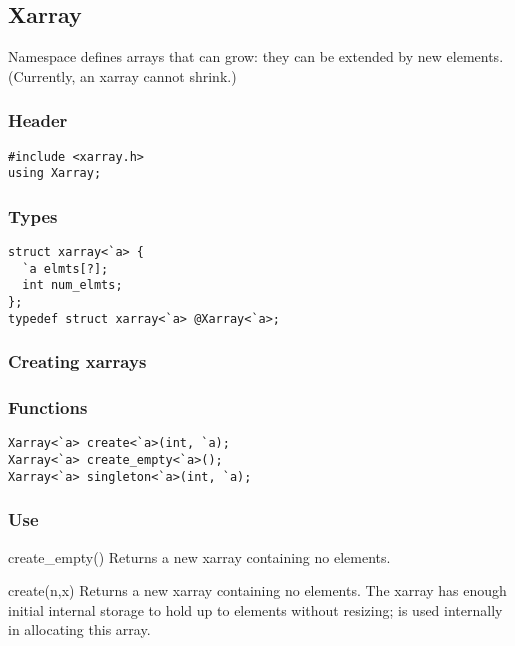 \subsection{Xarray}

Namespace  defines arrays that can grow: they can be
extended by new elements.  (Currently, an xarray cannot shrink.)

\subsubsection*{Header}
\begin{verbatim}
#include <xarray.h>
using Xarray;
\end{verbatim}

\subsubsection*{Types}
\begin{verbatim}
struct xarray<`a> {
  `a elmts[?];
  int num_elmts;
};
typedef struct xarray<`a> @Xarray<`a>;
\end{verbatim}

\subsubsection*{Creating xarrays}
\subsubsection*{Functions}
\begin{verbatim}
Xarray<`a> create<`a>(int, `a);
Xarray<`a> create_empty<`a>();
Xarray<`a> singleton<`a>(int, `a);
\end{verbatim}

\subsubsection*{Use}

\begin{defun}{create_empty}{()}
Returns a new xarray containing no elements.
\end{defun}

\begin{defun}{create}{(n,x)}
Returns a new xarray containing no elements.  The xarray has enough
initial internal storage to hold up to  elements without
resizing;  is used internally in allocating this array.
\end{defun}

